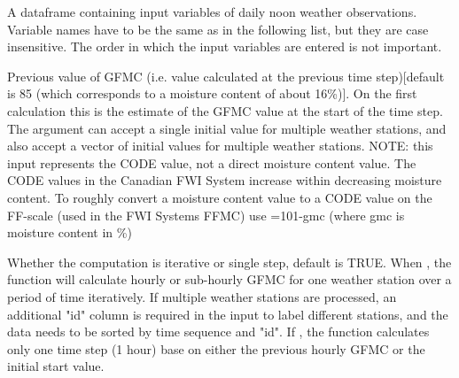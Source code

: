 \documentclass[a4paper]{book}
\begin{document}
\begin{Arguments}
\begin{ldescription}
\item[\code{input}] A dataframe containing input variables of daily noon weather
observations. Variable names have to be the same as in the following list,
but they are case insensitive. The order in which the input variables are
entered is not important.



\item[\code{GFMCold}] Previous value of GFMC (i.e. value calculated at the previous
time step)[default is 85 (which corresponds to a moisture content of about
16\%)]. On the first calculation this is the estimate of the GFMC value at
the start of the time step. The  argument can accept a single
initial value for multiple weather stations, and also accept a vector of
initial values for multiple weather stations.  NOTE: this input represents
the CODE value, not a direct moisture content value. The CODE values in the
Canadian FWI System increase within decreasing moisture content. To roughly
convert a moisture content value to a CODE value on the FF-scale (used in
the FWI Systems FFMC) use  =101-gmc (where gmc is moisture
content in \%)

\item[\code{batch}] Whether the computation is iterative or single step, default is
TRUE. When , the function will calculate hourly or
sub-hourly GFMC for one weather station over a period of time iteratively.
If multiple weather stations are processed, an additional "id" column is
required in the input to label different stations, and the data needs to be
sorted by time sequence and "id".  If , the function
calculates only one time step (1 hour) base on either the previous hourly
GFMC or the initial start value.


\end{ldescription}
\end{Arguments}
\end{document}
